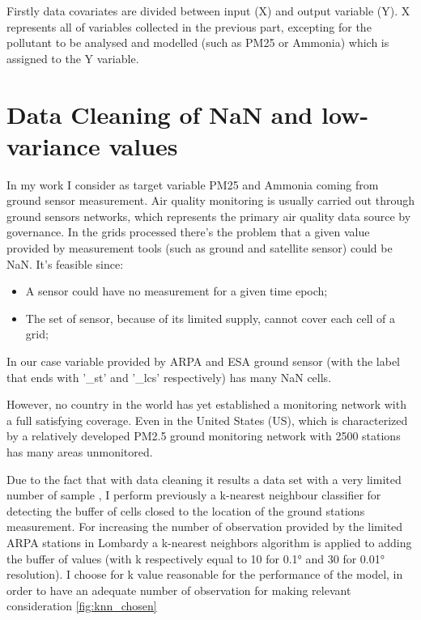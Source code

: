 Firstly data covariates are divided between input (X) and output variable (Y). X represents all of variables collected in the previous part, excepting for the pollutant to be analysed and modelled (such as PM25 or Ammonia) which is assigned to the Y variable.


\section{Data Cleaning of NaN and low-variance values }
\label{subsec:nan}
In my work I consider as target variable PM25 and Ammonia coming from ground sensor measurement.
Air quality monitoring is usually carried out through ground sensors networks, which represents the primary air quality data source by governance. \newline
In the grids processed there's the problem that a given value provided by measurement tools (such as ground and satellite sensor) could be NaN. 
It's feasible since:
\begin{itemize}
\item A sensor could have no measurement for a given time epoch;
\item The set of sensor, because of its limited supply, cannot cover each cell of a grid;
\end{itemize}
In our case variable provided by ARPA and ESA ground sensor (with the label that ends with '\_st' and '\_lcs' respectively) has many NaN cells.
\par
However, no country in the world has yet established a monitoring network with a full satisfying coverage\cite{liu2018improve}. Even in the United States (US), which is characterized by a relatively developed PM2.5 ground monitoring network with 2500 stations has many areas unmonitored\cite{liu2018improve}. \par
Due to the fact that with data cleaning it results a data set with a very limited number of sample \cite{zhang2018strategy}, I perform previously a k-nearest neighbour classifier\cite{taunk2019brief} for detecting the buffer of cells closed to the location of the ground stations measurement. For increasing the number of observation provided by the limited ARPA stations in Lombardy a k-nearest neighbors algorithm is applied to adding the buffer of values (with k respectively equal to 10 for 0.1° and 30 for 0.01° resolution).  
I choose for k value reasonable for the performance of the model, in order to have an adequate number of observation for making relevant consideration \ref{fig:knn_chosen}

